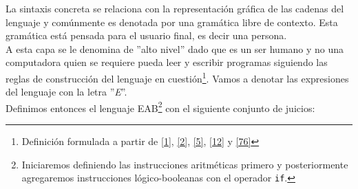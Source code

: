     La sintaxis concreta se relaciona con la representación gráfica de las cadenas del lenguaje y comúnmente es denotada por una gramática libre de contexto. Esta gramática está pensada para el usuario final, es decir una persona. \\
    A esta capa se le denomina de ''alto nivel'' dado que es un ser humano y no una computadora quien se requiere pueda leer y escribir programas siguiendo las reglas de construcción del lenguaje en cuestión\footnote{Definición formulada a partir de \hyperlink{1}{[1]}, \hyperlink{2}{[2]}, \hyperlink{5}{[5]}, \hyperlink{12}{[12]} y \hyperlink{76}{[76]}}. Vamos a denotar las expresiones del lenguaje con la letra ''\textit{E}''.\\
    Definimos entonces el lenguaje \textsf{EAB}\footnote{Iniciaremos definiendo las instrucciones aritméticas primero y posteriormente agregaremos instrucciones lógico-booleanas con el operador \texttt{if}.} con el siguiente conjunto de juicios: \\
    

     
